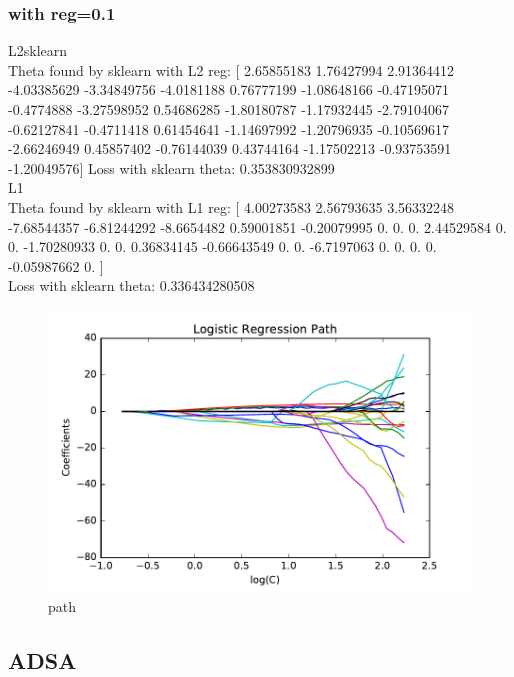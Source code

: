 \documentclass[pdftex,11pt]{article}
\begin{document}
\subsubsection{with reg=0.1}
L2sklearn\\
Theta found by sklearn with L2 reg:  [ 2.65855183  1.76427994  2.91364412 -4.03385629 -3.34849756 -4.0181188
  0.76777199 -1.08648166 -0.47195071 -0.4774888  -3.27598952  0.54686285
 -1.80180787 -1.17932445 -2.79104067 -0.62127841 -0.4711418   0.61454641
 -1.14697992 -1.20796935 -0.10569617 -2.66246949  0.45857402 -0.76144039
  0.43744164 -1.17502213 -0.93753591 -1.20049576]
Loss with sklearn theta:  0.353830932899\\
L1\\
Theta found by sklearn with L1 reg:  [ 4.00273583  2.56793635  3.56332248 -7.68544357 -6.81244292 -8.6654482
  0.59001851 -0.20079995  0.          0.          0.          2.44529584
  0.          0.         -1.70280933  0.          0.          0.36834145
 -0.66643549  0.          0.         -6.7197063   0.          0.          0.
  0.         -0.05987662  0.        ]\\
Loss with sklearn theta:  0.336434280508\\
\begin{figure}[H]
  \caption{path}
  \centering
    \includegraphics[scale=0.5]{fig5reg01.pdf}
\end{figure}






\subsection{ADSA}
\end{document}
